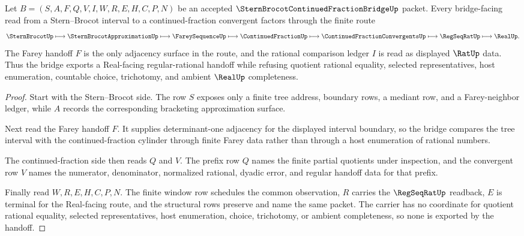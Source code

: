 \begin{theorem}
\label{thm:stern-brocot-continued-fraction-farey-handoff}
Let $B=(S,A,F,Q,V,I,W,R,E,H,C,P,N)$ be an accepted $\SternBrocotContinuedFractionBridgeUp$ packet. Every bridge-facing read from a Stern--Brocot interval to a continued-fraction convergent factors through the finite route
$$
\SternBrocotUp \longmapsto \SternBrocotApproximationUp \longmapsto \FareySequenceUp \longmapsto \ContinuedFractionUp \longmapsto \ContinuedFractionConvergentsUp \longmapsto \RegSeqRatUp \longmapsto \RealUp .
$$
The Farey handoff $F$ is the only adjacency surface in the route, and the rational comparison ledger $I$ is read as displayed $\RatUp$ data. Thus the bridge exports a Real-facing regular-rational handoff while refusing quotient rational equality, selected representatives, host enumeration, countable choice, trichotomy, and ambient $\RealUp$ completeness.
\end{theorem}
\begin{proof}
Start with the Stern--Brocot side. The row $S$ exposes only a finite tree address, boundary rows, a mediant row, and a Farey-neighbor ledger, while $A$ records the corresponding bracketing approximation surface.

Next read the Farey handoff $F$. It supplies determinant-one adjacency for the displayed interval boundary, so the bridge compares the tree interval with the continued-fraction cylinder through finite Farey data rather than through a host enumeration of rational numbers.

The continued-fraction side then reads $Q$ and $V$. The prefix row $Q$ names the finite partial quotients under inspection, and the convergent row $V$ names the numerator, denominator, normalized rational, dyadic error, and regular handoff data for that prefix.

Finally read $W,R,E,H,C,P,N$. The finite window row schedules the common observation, $R$ carries the $\RegSeqRatUp$ readback, $E$ is terminal for the Real-facing route, and the structural rows preserve and name the same packet. The carrier has no coordinate for quotient rational equality, selected representatives, host enumeration, choice, trichotomy, or ambient completeness, so none is exported by the handoff.
\end{proof}

